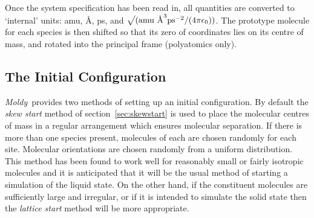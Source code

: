 \documentclass[a4paper,twoside]{report}
\newcommand{\moldy}{\emph{Moldy}}
\newcommand{\insqrt}{\sqrt{\mathstrut}}
\begin{document}
Once the system specification has been read in, all quantities are
converted to `internal' units: amu, {\AA}, ps, and $\insqrt (
\textnormal{amu {\AA}}^{3} \textnormal{ps}^{-2}/(4 \pi \epsilon_{0}) )$.
The prototype molecule for each species is then shifted so that its
zero of coordinates lies on its centre of mass, and rotated into the
principal frame (polyatomics only).

\subsection{The Initial Configuration}

\moldy\  provides two methods of setting up an initial configuration.
By default the \emph{skew start} method of section~\ref{sec:skewstart}
is used to place the molecular centres of mass in a regular
arrangement which ensures molecular separation.  If there is more than
one species present, molecules of each are chosen randomly for each
site.  Molecular orientations are chosen randomly from a uniform
distribution.  This method has been found to work well for reasonably
small or fairly isotropic molecules and it is anticipated that it will
be the usual method of starting a simulation of the liquid state.   On
the other hand, if the constituent molecules are sufficiently large
and irregular, or if it is intended to simulate the solid state then
the \emph{lattice start} method will be more appropriate.
\end{document}
